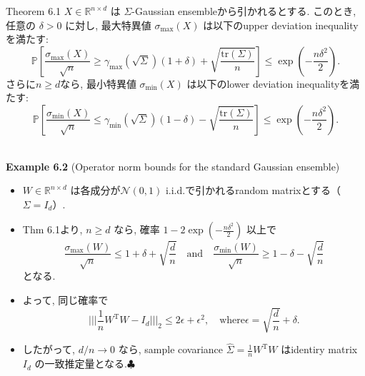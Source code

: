 \documentclass[unicode,aspectratio=169,11pt]{beamer}
\def\endexample{\hfill $\clubsuit$}
\newcommand{\bb}{\mathbb}
\newcommand{\cc}{\mathcal}
\newcommand{\tr}{\mathrm{T}}
\newcommand{\trace}{\mathrm{tr}}
\begin{document}
\begin{frame}{}{}
  \begin{block}{Theorem 6.1}
    $X \in \mathbb{R}^{n \times d}$ は $\Sigma$-Gaussian ensembleから引かれるとする.
    このとき, 任意の $\delta > 0$ に対し, 最大特異値 $\sigma_{\max}(X)$ は以下のupper deviation inequalityを満たす:
    \[
      \bb{P} \left[
        \frac{\sigma_{\max}(X)}{\sqrt{n}}
        \ge \gamma_{\max}\left(\sqrt{\Sigma}\right) (1+\delta) + \sqrt{\frac{\trace(\Sigma)}{n}}
      \right]
      \le \exp\left(-\frac{n\delta^2}{2}\right).
      \tag{6.8}
    \]
    さらに$n \ge d$なら, 最小特異値 $\sigma_{\min}(X)$ は以下のlower deviation inequalityを満たす:
    \[
        \bb{P} \left[
        \frac{\sigma_{\min}(X)}{\sqrt{n}}
        \le \gamma_{\min}\left(\sqrt{\Sigma}\right) (1-\delta) - \sqrt{\frac{\trace(\Sigma)}{n}}
      \right]
      \le \exp\left(-\frac{n\delta^2}{2}\right).
      \tag{6.9}
    \]
  \end{block}
\end{frame}

\begin{frame}{}{}
　\\
{\bf Example 6.2} (Operator norm bounds for the standard Gaussian ensemble)
\begin{itemize}
  \item $W \in \bb{R}^{n \times d}$ は各成分が$\cc{N} (0,1)$ i.i.d.で引かれるrandom matrixとする（$\Sigma = I_d$）.
  \item Thm 6.1より, $n \ge d$ なら, 確率 $1 - 2 \exp\left(-\frac{n\delta^2}{2}\right)$ 以上で
  \[\frac{\sigma_{\max}(W)}{\sqrt{n}} \le 1 + \delta + \sqrt{\frac{d}{n}}
  \quad \mathrm{and} \quad
  \frac{\sigma_{\min}(W)}{\sqrt{n}} \ge 1 - \delta - \sqrt{\frac{d}{n}}
  \tag{6.10}
  \]
  となる.
  \item よって, 同じ確率で
  \[ \Bigg|\Bigg|\Bigg| \frac{1}{n}W^\tr W - I_d \Bigg|\Bigg|\Bigg|_2 \le 2\epsilon + \epsilon^2,
  \quad \mathrm{where} \epsilon = \sqrt{\frac{d}{n}} + \delta.
  \tag{6.11} \]
  \item したがって, $d/n \to 0$ なら, sample covariance $\widehat{\Sigma} = \frac{1}{n}W^\tr W$ はidentiry matrix $I_d$ の一致推定量となる.\endexample
\end{itemize}
\end{frame}
\end{document}
